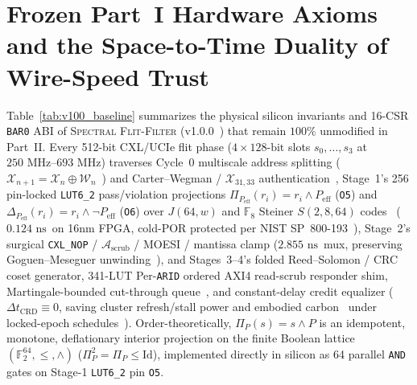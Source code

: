 \documentclass[10pt,twocolumn]{article}
\providecommand{\BaselineVersion}{v1.0.0}
\providecommand{\ScrubShimLuts}{341}
\providecommand{\StageOneNs}{\ensuremath{0.124\text{~ns}}}
\providecommand{\StageTwoNs}{\ensuremath{2.855\text{~ns}}}
\theoremstyle{spectralthm}
\begin{document}
\section{Frozen Part~I Hardware Axioms and the Space-to-Time Duality of Wire-Speed Trust}
\label{sec:duality}

Table~\ref{tab:v100_baseline} summarizes the physical silicon invariants and 16-CSR \texttt{BAR0} ABI of \textsc{Spectral Flit-Filter} (\BaselineVersion~\cite{murphy2026part1}) that remain $100\%$ unmodified in Part~II. Every 512-bit CXL/UCIe flit phase ($4 \times 128\text{-bit}$ slots $s_0,\ldots,s_3$ at $250\text{~MHz}$--$693\text{~MHz}$) traverses Cycle~0 multiscale address splitting ($\mathcal{X}_{n+1} = \mathcal{X}_n \oplus \mathcal{W}_n$~\cite{chen2001multilevel}) and Carter--Wegman / $\mathcal{X}_{31,33}$ authentication~\cite{carter1979universal,daemen1995cipher}, Stage~1's 256 pin-locked \mbox{\texttt{LUT6\_2}} pass/violation projections $\Pi_{P_{\mathrm{eff}}}(r_i) = r_i \wedge P_{\mathrm{eff}}$ (\texttt{O5}) and $\Delta_{P_{\mathrm{eff}}}(r_i) = r_i \wedge \neg P_{\mathrm{eff}}$ (\texttt{O6}) over $J(64,w)$ and $\mathbb{F}_8$ Steiner $S(2,8,64)$ codes~\cite{kautz1964nonrandom,welch1974lower,erdos1985families} (\StageOneNs\ on 16nm FPGA, cold-POR protected per NIST SP~800-193~\cite{regenscheid2018pfr}), Stage~2's surgical \texttt{CXL\_NOP} / $\mathcal{A}_{\mathrm{scrub}}$ / MOESI / mantissa clamp (\StageTwoNs\ mux, preserving Goguen--Meseguer unwinding~\cite{goguen1982security}), and Stages~3--4's folded Reed--Solomon / CRC coset generator, \ScrubShimLuts-LUT Per-\texttt{ARID} ordered AXI4 read-scrub responder shim, Martingale-bounded cut-through queue~\cite{poloczek2014martingale}, and constant-delay credit equalizer ($\Delta t_{\mathrm{CRD}} \equiv 0$, saving cluster refresh/stall power and embodied carbon~\cite{shehabi2024lbnl,siddik2021water,gupta2022act,thornton2026renesis} under locked-epoch schedules~\cite{azar2009buffer,azar2013metric,azar2026lossless}). Order-theoretically, $\Pi_P(s) = s \wedge P$ is an idempotent, monotone, deflationary interior projection on the finite Boolean lattice $(\mathbb{F}_2^{64}, \le, \wedge)$ ($\Pi_P^2 = \Pi_P \le \mathrm{Id}$), implemented directly in silicon as 64 parallel \texttt{AND} gates on Stage-1 \mbox{\texttt{LUT6\_2}} pin \texttt{O5}.
\end{document}
